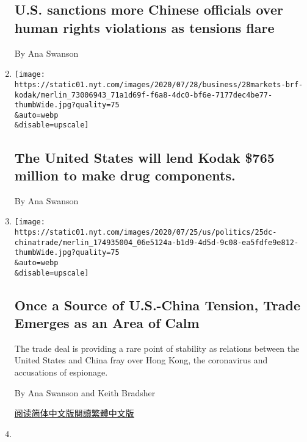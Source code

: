 \begin{enumerate}
  \hypertarget{us-sanctions-more-chinese-officials-over-human-rights-violations-as-tensions-flare}{%
  \subsection{U.S. sanctions more Chinese officials over human rights
  violations as tensions
  flare}\label{us-sanctions-more-chinese-officials-over-human-rights-violations-as-tensions-flare}}

  By Ana Swanson
\item
  \href{/live/2020/07/28/business/stock-market-today-coronavirus/the-united-states-will-lend-kodak-765-million-to-make-drug-components}{}

  \texttt{[image: https://static01.nyt.com/images/2020/07/28/business/28markets-brf-kodak/merlin\_73006943\_71a1d69f-f6a8-4dc0-bf6e-7177dec4be77-thumbWide.jpg?quality=75\\\&auto=webp\\\&disable=upscale]}

  \hypertarget{the-united-states-will-lend-kodak-765-million-to-make-drug-components}{%
  \subsection{The United States will lend Kodak \$765 million to make
  drug
  components.}\label{the-united-states-will-lend-kodak-765-million-to-make-drug-components}}

  By Ana Swanson
\item
  \href{/2020/07/25/business/economy/us-china-trade-diplomacy.html}{}

  \texttt{[image: https://static01.nyt.com/images/2020/07/25/us/politics/25dc-chinatrade/merlin\_174935004\_06e5124a-b1d9-4d5d-9c08-ea5fdfe9e812-thumbWide.jpg?quality=75\\\&auto=webp\\\&disable=upscale]}

  \hypertarget{once-a-source-of-us-china-tension-trade-emerges-as-an-area-of-calm}{%
  \subsection{Once a Source of U.S.-China Tension, Trade Emerges as an
  Area of
  Calm}\label{once-a-source-of-us-china-tension-trade-emerges-as-an-area-of-calm}}

  The trade deal is providing a rare point of stability as relations
  between the United States and China fray over Hong Kong, the
  coronavirus and accusations of espionage.

  By Ana Swanson and Keith Bradsher

  \href{https://cn.nytimes.com/business/20200727/us-china-trade-diplomacy/}{阅读简体中文版}\href{https://cn.nytimes.com/business/20200727/us-china-trade-diplomacy/zh-hant/}{閱讀繁體中文版}
\item
  \href{/2020/07/22/business/companies-may-move-supply-chains-out-of-china-but-not-necessarily-to-the-us.html}{}


\end{enumerate}
